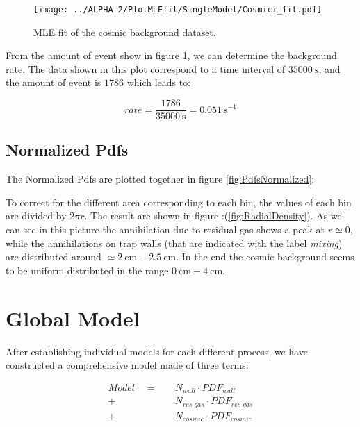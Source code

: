 \documentclass[11pt,a4paper,oneside]{article}
\begin{document}
\begin{figure}[hbtp]

\centering
\texttt{[image: ../ALPHA-2/PlotMLEfit/SingleModel/Cosmici\_fit.pdf]}
\caption{ MLE fit of the cosmic background dataset.}
\label{fig:CosmicBackground}
\end{figure}

From the amount of event show in figure \ref{fig:CosmicBackground}, we can determine the background rate. The data shown in this plot correspond to a time interval of $\SI{35000}{\second}$, and the amount of event is $1786$ which leads to:

\begin{equation} \label{eq:Rate}
rate = \frac{1786}{\SI{35000}{\second}} = \SI{0.051}{\second \tothe{-1}}
\end{equation}

\subsection{Normalized Pdfs}

The Normalized Pdfs are plotted together in figure \ref{fig:PdfsNormalized}:
\begin{figure}[!hbtp]
\centering
{}
\end{figure}

To correct for the different area corresponding to each bin, the values of each bin are divided by $ 2 \pi r$. The result are shown in figure :(\ref{fig:RadialDensity}). As we can see in this picture the annihilation due to residual gas shows a peak at $r \simeq 0$, while the annihilations on trap walls (that are indicated with the label \textit{mixing}) are distributed around $\simeq \SI{2}{ \centi \meter} - \SI{2.5}{\centi \meter}$. In the end the cosmic background seems to be uniform distributed in the range $\SI{0}{\centi \meter} - \SI{4}{\centi \meter}$.
\section*{Global Model}

After establishing individual models for each different process, we have constructed a comprehensive model made of three terms:

\begin{equation} \label{eq:GlobalModel}
\begin{split}
Model \quad = \quad &N_{wall} \cdot PDF_{wall} \\
	+ &N_{res \; gas} \cdot PDF_{res \; gas}\\ 
	+ &N_{cosmic} \cdot PDF_{cosmic}
\end{split} 
\end{equation} 
\end{document}
